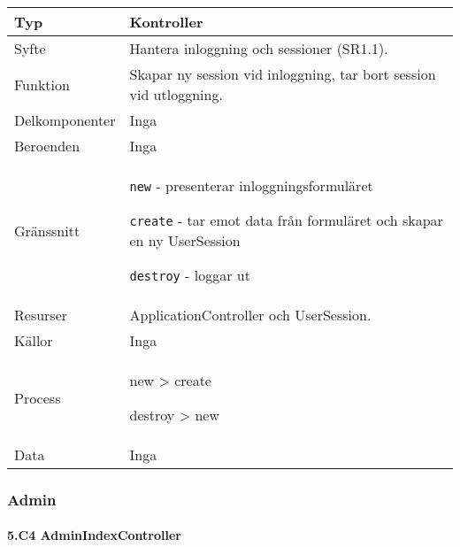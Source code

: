 \documentclass[a4paper, twoside, 11pt, titlepage]{article}
\begin{document}
			\begin {table} [ht] \begin{tabular} {  p{3.5cm} p{9.6cm} }
				\hline
				{Typ} & {Kontroller} \\
				\hline
				{Syfte} & {Hantera inloggning och sessioner (SR1.1).} \\
				\hline
				{Funktion} & {Skapar ny session vid inloggning, tar bort session vid utloggning.} \\
				\hline
				{Delkomponenter} & {Inga} \\
				\hline
				{Beroenden} & {Inga} \\
				\hline
				{Gränssnitt} & {{\tt new} - presenterar inloggningsformuläret

{\tt create} - tar emot data från formuläret och skapar en ny UserSession

{\tt destroy} - loggar ut} \\
				\hline
				{Resurser} & {ApplicationController och UserSession.} \\
				\hline
				{Källor} & {Inga} \\
				\hline
				{Process} & {new > create

destroy > new} \\
				\hline
				{Data} & {Inga} \\
				\hline
			\end{tabular} \end{table} \FloatBarrier


		\subsubsection{Admin}



			\paragraph{5.C4 AdminIndexController}\
\end{document}
